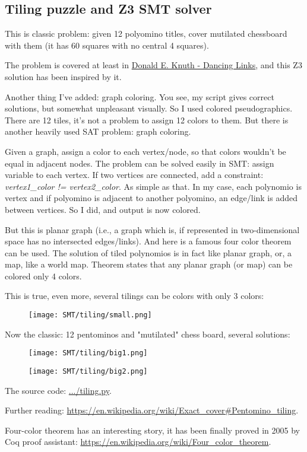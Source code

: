 \subsection{Tiling puzzle and Z3 SMT solver}
\label{tiling_Z3}

This is classic problem: given 12 polyomino titles, cover mutilated chessboard with them (it has 60 squares with no central 4 squares).

The problem is covered at least in \href{https://arxiv.org/pdf/cs/0011047.pdf}{Donald E. Knuth - Dancing Links},
and this Z3 solution has been inspired by it.

Another thing I've added: graph coloring. You see, my script gives correct solutions, but somewhat unpleasant visually.
So I used colored pseudographics. There are 12 tiles, it's not a problem to assign 12 colors to them.
But there is another heavily used SAT problem: graph coloring.

Given a graph, assign a color to each vertex/node, so that colors wouldn't be equal in adjacent nodes.
The problem can be solved easily in SMT: assign variable to each vertex.
If two vertices are connected, add a constraint: \textit{vertex1\_color != vertex2\_color}.
As simple as that.
In my case, each polynomio is vertex and if polyomino is adjacent to another polyomino, an edge/link is added between vertices.
So I did, and output is now colored.

But this is planar graph (i.e., a graph which is, if represented in two-dimensional space has no intersected edges/links).
And here is a famous four color theorem can be used.
The solution of tiled polynomios is in fact like planar graph, or, a map, like a world map.
Theorem states that any planar graph (or map) can be colored only 4 colors.

This is true, even more, several tilings can be colors with only 3 colors:

\begin{figure}[H]
\centering
\texttt{[image: SMT/tiling/small.png]}
\caption{}
\end{figure}

Now the classic: 12 pentominos and "mutilated" chess board, several solutions:

\begin{figure}[H]
\centering
\texttt{[image: SMT/tiling/big1.png]}
\caption{}
\end{figure}

\begin{figure}[H]
\centering
\texttt{[image: SMT/tiling/big2.png]}
\caption{}
\end{figure}

The source code: \url{.../tiling.py}.

Further reading: \url{https://en.wikipedia.org/wiki/Exact_cover#Pentomino_tiling}.

Four-color theorem has an interesting story, it has been finally proved in 2005 by Coq proof assistant:
\url{https://en.wikipedia.org/wiki/Four_color_theorem}.


